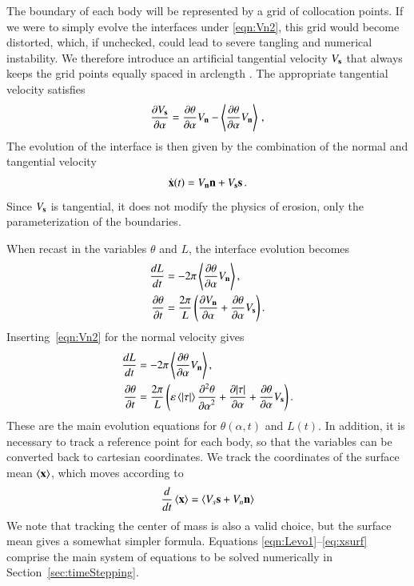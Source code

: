 \documentclass[preprint, 10pt]{elsarticle}
\begin{document}
The boundary of each body will be represented by a grid of collocation points. If we were to simply evolve the interfaces under \eqref{eqn:Vn2}, this grid would become distorted, which, if unchecked, could lead to severe tangling and numerical instability. We therefore introduce an artificial tangential velocity $V_{\mathbf{s}}$ that always keeps the grid points equally spaced in arclength \cite{hou-low-she1994}. The appropriate tangential velocity satisfies 
\begin{align}
\frac{\partial V_{\mathbf{s}}}{\partial \alpha} = \frac{\partial \theta}{\partial \alpha} V_{\mathbf{n}} - \left< \frac{\partial \theta}{\partial \alpha} V_{\mathbf{n}} \right> \, ,
\end{align}
The evolution of the interface is then given by the combination of the normal and tangential velocity
\begin{align}
\dot{{\mathbf{x}}}(t) = V_{\mathbf{n}} {\mathbf{n}} + V_{\mathbf{s}} {\mathbf{s}} \, .
\end{align}
Since $V_{\mathbf{s}}$ is tangential, it does not modify the physics of erosion, only the parameterization of the boundaries.

When recast in the variables $\theta$ and $L$, the interface evolution becomes
\begin{align}
\frac{d L}{d t} &= - 2 \pi \left< \frac{\partial \theta}{\partial \alpha} V_{\mathbf{n}} \right>, \\
\frac{\partial \theta}{\partial t} &= \frac{2 \pi}{L} \left( \frac{\partial V_{\mathbf{n}}}{\partial \alpha} +
\frac{\partial \theta}{\partial \alpha} V_{\mathbf{s}} \right).
\end{align}
Inserting~\eqref{eqn:Vn2} for the normal velocity gives
\begin{align}
\label{eqn:Levo1}
\frac{d L}{d t} &= - 2 \pi \left< \frac{\partial \theta}{\partial \alpha} V_{\mathbf{n}} \right>, \\
\label{eqn:thetaevo1}
\frac{\partial \theta}{\partial t} &= \frac{2\pi}{L} \left(
\varepsilon \left< \lvert \tau \rvert \right> \frac{\partial^2 \theta}{{\partial \alpha}^2} + \frac{\partial \lvert \tau \rvert}{\partial \alpha} +
\frac{\partial \theta}{\partial \alpha} V_{\mathbf{s}} \right).
\end{align}
These are the main evolution equations for $\theta(\alpha,t)$ and $L(t)$.
In addition, it is necessary to track a reference point for each body, so that the {\thL} variables can be converted back to cartesian coordinates. We track the coordinates of the surface mean $\left< {\mathbf{x}} \right>$, which moves according to
\begin{align}
\label{eq:xsurf}
\frac{d}{dt} \left< {\mathbf{x}} \right> = \left<  V_s {\mathbf{s}} + V_n {\mathbf{n}}  \right>
\end{align}
We note that tracking the center of mass is also a valid choice, but the surface mean gives a somewhat simpler formula. Equations \eqref{eqn:Levo1}--\eqref{eq:xsurf} comprise the main system of equations to be solved numerically in Section~\ref{sec:timeStepping}. 

\end{document}
